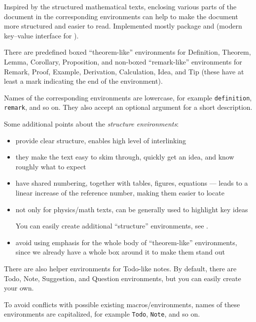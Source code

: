Inspired by the structured mathematical texts, enclosing various parts of the document in the corresponding environments can help to make the document more structured and easier to read.
Implemented mostly  package and  (modern key--value interface for ).

\begin{remark}
    There are predefined boxed \enquote{theorem-like} environments for \textsf{Definition}, \textsf{Theorem}, \textsf{Lemma}, \textsf{Corollary}, \textsf{Proposition},
    and non-boxed \enquote{remark-like} environments for \textsf{Remark}, \textsf{Proof}, \textsf{Example}, \textsf{Derivation}, \textsf{Calculation}, \textsf{Idea}, and \textsf{Tip} (these have at least a mark indicating the end of the environment).

    Names of the corresponding environments are lowercase, for example \texttt{definition}, \texttt{remark}, and so on.
    They also accept an optional argument for a short description.
\end{remark}

Some additional points about the \emph{structure environments}:
\begin{itemize}
    \item provide clear structure, enables high level of interlinking
    \item they make the text easy to skim through, quickly get an idea, and know roughly what to expect
    \item have shared numbering, together with tables, figures, equations --- leads to a linear increase of the reference number, making them easier to locate
    \item not only for physics/math texts, can be generally used to highlight key ideas
          \begin{tip}
              You can easily create additional \enquote{structure} environments, see .
          \end{tip}
    \item avoid using emphasis for the whole body of \enquote{theorem-like} environments, since we already have a whole box around it to make them stand out
\end{itemize}
\vspace{1ex}

\begin{remark}
    There are also helper environments for \textsf{Todo}-like notes.
    By default, there are \textsf{Todo}, \textsf{Note}, \textsf{Suggestion}, and \textsf{Question} environments, but you can easily create your own.

    To avoid conflicts with possible existing macros/environments, names of these environments are capitalized, for example \texttt{Todo}, \texttt{Note}, and so on.
\end{remark}

